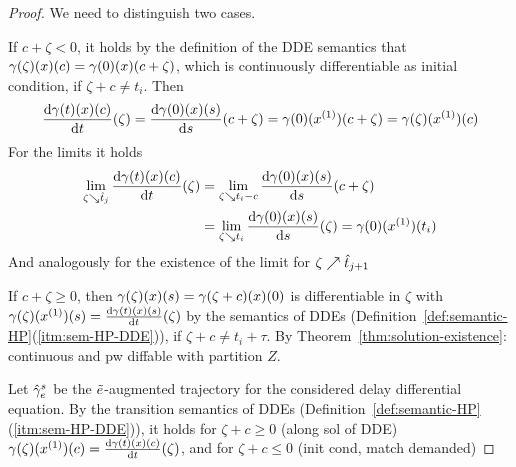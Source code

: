 \begin{proof}
        We need to distinguish two cases.

        If $c+\zeta<0$, it holds by the definition of the DDE semantics that $\trajectory(\zeta)(x)(c)=\trajectory(0)(x)(c+\zeta)$, which is continuously differentiable as initial condition, if $\zeta+c\neq t_i$. Then
        \begin{equation*}
            \DD{\trajectory(t)(x)(c)}{t}(\zeta)=\DD{\trajectory(0)(x)(s)}{s}(c+\zeta)=\trajectory(0)(\D{x})(c+\zeta)=\trajectory(\zeta)(\D{x})(c)
        \end{equation*}
        For the limits it holds
        \begin{align*}
            \lim_{\zeta\downto\hat{t}_j} \DD{\trajectory(t)(x)(c)}{t}(\zeta)
                & = \lim_{\zeta\downto t_i-c} \DD{\trajectory(0)(x)(s)}{s}(c+\zeta)\\
                & = \lim_{\zeta\downto t_i} \DD{\trajectory(0)(x)(s)}{s}(\zeta)
                = \trajectory(0)(\D{x})(t_i)
        \end{align*}
        And analogously for the existence of the limit for $\zeta\upto\hat{t}_{j+1}$

        If $c+\zeta\geq 0$, then $\trajectory(\zeta)(x)(s)=\trajectory(\zeta+c)(x)(0)$ is differentiable in $\zeta$ with $\trajectory(\zeta)(\D{x})(s) = \DD{\trajectory(t)(x)(s)}{t}(\zeta)$ by the semantics of DDEs (Definition~\ref{def:semantic-HP}(\ref{itm:sem-HP-DDE})), if $\zeta+c\neq t_i+\tau$.
        By Theorem~\ref{thm:solution-existence}: continuous and pw diffable with partition $Z$.



        Let $\augtrajectory[s]{\astrm}$ be the $\bstrm$-augmented trajectory for the considered delay differential equation.
        By the transition semantics of DDEs (Definition~\ref{def:semantic-HP}\,(\ref{itm:sem-HP-DDE})), it holds for $\zeta+c\geq 0$ (along sol of DDE)
        $\trajectory(\zeta)(\D{x})(c) = \DD{\trajectory(t)(x)(c)}{t}(\zeta)$, and for $\zeta+c\leq 0$ (init cond, match demanded)


\end{proof}
